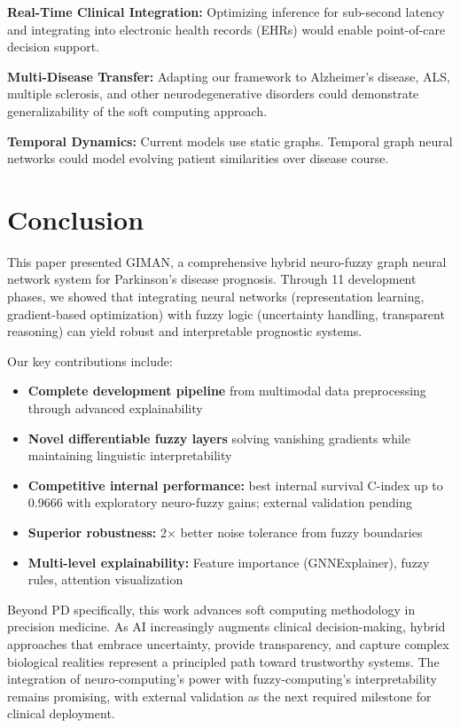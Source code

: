 \documentclass[conference]{IEEEtran}
\begin{document}
\textbf{Real-Time Clinical Integration:} Optimizing inference for sub-second latency and integrating into electronic health records (EHRs) would enable point-of-care decision support.

\textbf{Multi-Disease Transfer:} Adapting our framework to Alzheimer's disease, ALS, multiple sclerosis, and other neurodegenerative disorders could demonstrate generalizability of the soft computing approach.

\textbf{Temporal Dynamics:} Current models use static graphs. Temporal graph neural networks \cite{kazemi2020representation} could model evolving patient similarities over disease course.

\section{Conclusion}

This paper presented GIMAN, a comprehensive hybrid neuro-fuzzy graph neural network system for Parkinson's disease prognosis. Through 11 development phases, we showed that integrating neural networks (representation learning, gradient-based optimization) with fuzzy logic (uncertainty handling, transparent reasoning) can yield robust and interpretable prognostic systems.

Our key contributions include:

\begin{itemize}
    \item \textbf{Complete development pipeline} from multimodal data preprocessing through advanced explainability
    \item \textbf{Novel differentiable fuzzy layers} solving vanishing gradients while maintaining linguistic interpretability
    \item \textbf{Competitive internal performance:} best internal survival C-index up to 0.9666 with exploratory neuro-fuzzy gains; external validation pending
    \item \textbf{Superior robustness:} 2× better noise tolerance from fuzzy boundaries
    \item \textbf{Multi-level explainability:} Feature importance (GNNExplainer), fuzzy rules, attention visualization
\end{itemize}

Beyond PD specifically, this work advances soft computing methodology in precision medicine. As AI increasingly augments clinical decision-making, hybrid approaches that embrace uncertainty, provide transparency, and capture complex biological realities represent a principled path toward trustworthy systems. The integration of neuro-computing's power with fuzzy-computing's interpretability remains promising, with external validation as the next required milestone for clinical deployment.
\end{document}
